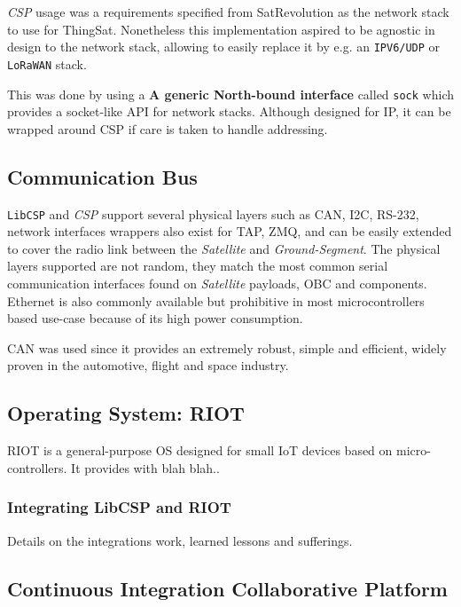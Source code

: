 \textit{CSP} usage was a requirements specified from SatRevolution as the network
stack to use for ThingSat. Nonetheless this implementation aspired to be agnostic
in design to the network stack, allowing to easily replace it by e.g. an
\texttt{IPV6/UDP} or \texttt{LoRaWAN} stack.

This was done by using a {\bf A generic North-bound interface} called \texttt{sock}
which provides a socket-like API for network stacks. Although designed for IP,
it can be wrapped around CSP if care is taken to handle addressing.

\subsection{Communication Bus}

\texttt{LibCSP} and \textit{CSP} support several physical layers such as CAN, I2C,
RS-232, network interfaces wrappers also exist for TAP, ZMQ, and can be easily
extended to cover the radio link between the \textit{Satellite} and
\textit{Ground-Segment}. The physical layers supported are not random, they match
the most common serial communication interfaces found on \textit{Satellite}
payloads, OBC and components. Ethernet is also commonly available  but prohibitive
in most microcontrollers based use-case because of its high power consumption.

CAN was used since it provides an extremely robust, simple and efficient,
widely proven in the automotive, flight and space industry.

\subsection{Operating System: RIOT}

RIOT is a general-purpose OS designed for small IoT devices based on micro-controllers.
It provides with blah blah..

\subsubsection{Integrating LibCSP and RIOT}

Details on the integrations work, learned lessons and sufferings.
\fi

\subsection{Continuous Integration \- Collaborative Platform}

